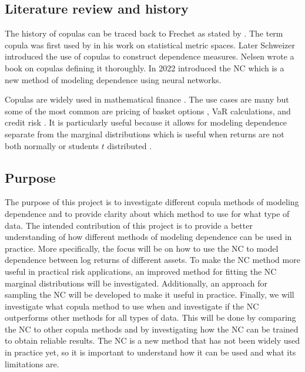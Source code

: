 \subsection{Literature review and history}\label{LiteratureReview}
The history of copulas can be traced back to Frechet  as stated by . The term copula was first used by  in his work on statistical metric spaces. Later Schweizer introduced the use of copulas to construct dependence measures. Nelsen wrote a book on copulas defining it thoroughly. In 2022  introduced the \gls{NC} which is a new method of modeling dependence using neural networks. 


Copulas are widely used in mathematical finance . The use cases are many but some of the most common are pricing of basket options , \gls{VaR}  calculations, and credit risk . It is particularly useful because it allows for modeling dependence separate from the marginal distributions which is useful when returns are not both normally or students $t$ distributed . 
 
\subsection{Purpose}\label{Purpose}
The purpose of this project is to investigate different copula methods of modeling dependence and to provide clarity about which method to use for what type of data. The intended contribution of this project is to provide a better understanding of how different methods of modeling dependence can be used in practice. More specifically, the focus will be on how to use the \gls{NC} to model dependence between log returns of different assets. To make the \gls{NC} method more useful in practical risk applications, an improved method for fitting the \gls{NC} marginal distributions will be investigated. Additionally, an approach for sampling the \gls{NC} will be developed to make it useful in practice. Finally, we will investigate what copula method to use when and investigate if the \gls{NC} outperforms other methods for all types of data. This will be done by comparing the \gls{NC} to other copula methods and by investigating how the \gls{NC} can be trained to obtain reliable results. The \gls{NC} is a new method that has not been widely used in practice yet, so it is important to understand how it can be used and what its limitations are. 

